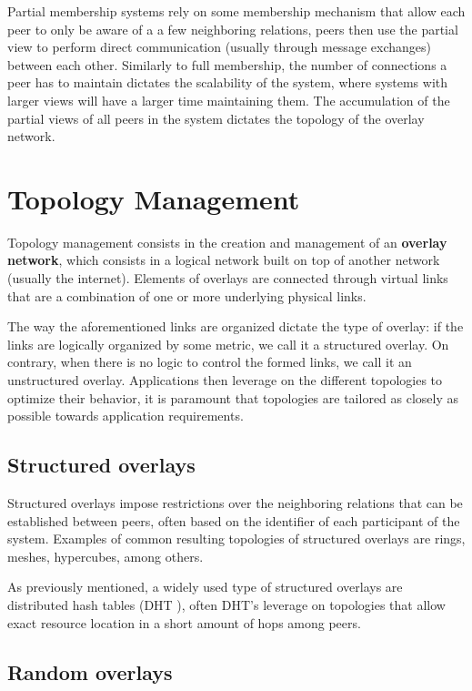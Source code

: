 Partial membership systems rely on some membership mechanism that allow each peer to only be aware of a a few neighboring relations, peers then use the partial view to perform direct communication  (usually through message exchanges) between each other. Similarly to full membership, the number of connections a peer has to maintain dictates the scalability of the system, where systems with larger views will have a larger time maintaining them. The accumulation of the partial views of all peers in the system dictates the topology of the overlay network.

\section{Topology Management} %
\label{sec:topology_mgmt}

Topology management consists in the creation and management of an
\textbf{overlay network}, which consists in a logical network built on top of another
network (usually the internet). Elements of overlays are connected through 
virtual links that are a combination of one or more underlying physical links.

The way the aforementioned links are organized dictate the type of overlay: if the links are logically organized by some metric, we call it a structured overlay. On contrary, when there is no logic to control the formed links, we call it an unstructured overlay. Applications then leverage on the different topologies to optimize their behavior, it is paramount that topologies are tailored as closely as possible towards application requirements.

\subsection{Structured overlays}

Structured overlays impose restrictions over the neighboring relations that can be established between peers, often based on the identifier of each participant of the system. Examples of common resulting topologies of structured overlays are rings, meshes, hypercubes, among others.

As previously mentioned, a widely used type of structured overlays are distributed hash tables (DHT
), often DHT's leverage on topologies that allow exact resource location in a short amount of hops among peers.

\subsection{Random overlays}


